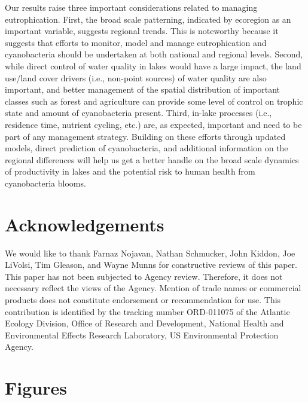 \documentclass[12pt,]{article}
\begin{document}
Our results raise three important considerations related to managing
eutrophication. First, the broad scale patterning, indicated by
ecoregion as an important variable, suggests regional trends. This is
noteworthy because it suggests that efforts to monitor, model and manage
eutrophication and cyanobacteria should be undertaken at both national
and regional levels. Second, while direct control of water quality in
lakes would have a large impact, the land use/land cover drivers (i.e.,
non-point sources) of water quality are also important, and better
management of the spatial distribution of important classes such as
forest and agriculture can provide some level of control on trophic
state and amount of cyanobacteria present. Third, in-lake processes
(i.e., residence time, nutrient cycling, etc.) are, as expected,
important and need to be part of any management strategy. Building on
these efforts through updated models, direct prediction of
cyanobacteria, and additional information on the regional differences
will help us get a better handle on the broad scale dynamics of
productivity in lakes and the potential risk to human health from
cyanobacteria blooms.

\section{Acknowledgements}\label{acknowledgements}

We would like to thank Farnaz Nojavan, Nathan Schmucker, John Kiddon,
Joe LiVolsi, Tim Gleason, and Wayne Munns for constructive reviews of
this paper. This paper has not been subjected to Agency review.
Therefore, it does not necessary reflect the views of the Agency.
Mention of trade names or commercial products does not constitute
endorsement or recommendation for use. This contribution is identified
by the tracking number ORD-011075 of the Atlantic Ecology Division,
Office of Research and Development, National Health and Environmental
Effects Research Laboratory, US Environmental Protection Agency.

\newpage

\section{Figures}\label{figures}
\end{document}

